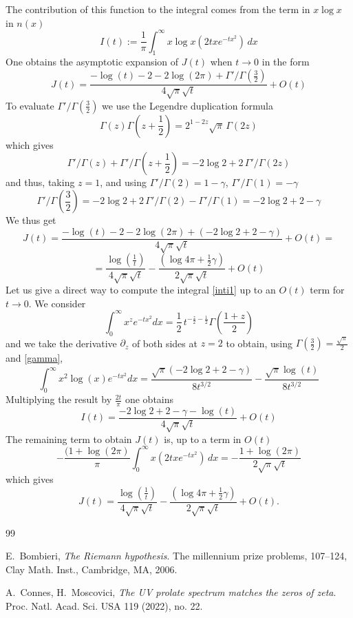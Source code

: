 \documentclass[reqno,12pt]{amsart}
\begin{document}
  The contribution of this function to the integral comes from the term in $x\log x$ in $n(x)$
  \begin{equation}\label{inti1}
  I(t):=\frac 1 \pi \int_1^{\infty } x\log x \left(2 t x e^{-t x^2}\right) \, dx
  \end{equation}
  One obtains the asymptotic expansion of $J(t)$ when $t\to 0$ in the form
  $$
 J(t)= \frac{-\log (t)-2-2 \log (2 \pi )+\Gamma'/\Gamma\left(\frac{3}{2}\right)}{4 \sqrt{\pi } \sqrt{t}}+O(t)
  $$
  To evaluate $\Gamma'/\Gamma\left(\frac{3}{2}\right)$ we use the Legendre duplication formula
  $$
  \Gamma(z)\Gamma(z+\frac 12)=2^{1-2z}\sqrt{\pi }\, \Gamma(2z)
  $$
  which gives 
  $$
  \Gamma'/\Gamma(z)+\Gamma'/\Gamma(z+\frac 12)=-2\log 2+2\,\Gamma'/\Gamma(2z)
  $$
  and thus, taking $z=1$, and using $\Gamma'/\Gamma(2)=1-\gamma$, $\Gamma'/\Gamma(1)=-\gamma$
 \begin{equation}\label{gamma}
  \Gamma'/\Gamma\left(\frac 32\right)=-2\log 2+2\,\Gamma'/\Gamma(2)-\Gamma'/\Gamma(1)=-2\log 2+2-\gamma
 \end{equation}
  We thus get   
  $$
  J(t)= \frac{-\log (t)-2-2 \log (2 \pi )+(-2\log 2+2-\gamma)}{4 \sqrt{\pi } \sqrt{t}}+O(t)=$$ $$ =\frac{\log \left(\frac{1}{ t}\right) }{4 \sqrt{\pi } \sqrt{t}}-\frac{(\log 4\pi +\frac 12\gamma)}{2\sqrt{ \pi } \sqrt{t}}+O(t)
  $$
   \endproof 
  Let us give a direct way to compute the integral \eqref{inti1} up to an $O(t)$ term for $t\to 0$. We consider 
  $$
  \int_0^\infty x^z e^{-t x^2}dx=\frac 12\,t^{-\frac z2-\frac 12}\Gamma(\frac{1+z}{2})
  $$
  and we take the derivative $\partial_z$ of both sides at $z=2$ to obtain, using $\Gamma(\frac 32)=\frac{\sqrt{\pi }}{2}$ and \eqref{gamma},
  $$
  \int_0^\infty x^2 \log(x) e^{-t x^2}dx=\frac{\sqrt{\pi }( -2\log 2+2-\gamma)}{8 t^{3/2}}-\frac{\sqrt{\pi } \log (t)}{8 t^{3/2}}
  $$
 Multiplying the result by $\frac {2t}{\pi}$ one obtains 
 $$
 I(t)=\frac{-2\log 2+2-\gamma-\log (t)}{4 \sqrt{\pi } \sqrt{t}}+O(t)
 $$ 
 The remaining term to obtain $J(t)$ is, up to a term in $O(t)$ 
 $$
 -\frac{(1+\log (2 \pi )}{\pi}\int_0^{\infty } x \left(2 t x e^{-t x^2}\right) \, dx=-\frac{1+\log (2 \pi )}{2 \sqrt{\pi } \sqrt{t}}
 $$
 which gives
 $$
J(t) =\frac{\log \left(\frac{1}{ t}\right) }{4 \sqrt{\pi } \sqrt{t}}-\frac{(\log 4\pi +\frac 12\gamma)}{2\sqrt{ \pi } \sqrt{t}}+O(t).
 $$
 

 \begin{thebibliography}{99}
 
 
  E.~Bombieri, \emph{The Riemann hypothesis}. The millennium prize problems, 107--124, Clay Math. Inst., Cambridge, MA, 2006.
 
  A.~Connes, H.~Moscovici, {\em The UV prolate spectrum matches the zeros of zeta}. Proc. Natl. Acad. Sci. USA 119 (2022), no. 22. 
 \end{thebibliography}
\end{document}
